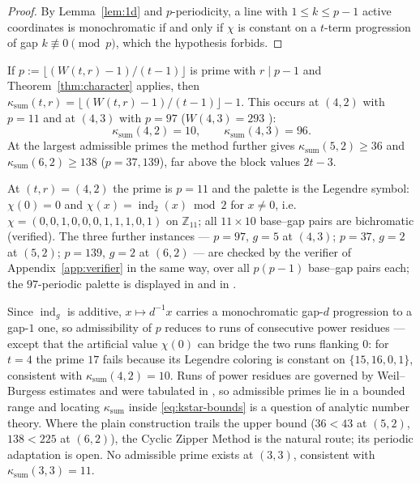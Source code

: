 \documentclass[12pt]{article}
\newcommand{\Wvdw}{W}
\newcommand{\Z}{\mathbb{Z}}
\newcommand{\ksum}{\kappa_{\mathrm{sum}}}
\DeclareMathOperator{\ind}{ind}
\begin{document}
\begin{proof}
By Lemma~\ref{lem:1d} and $p$-periodicity, a line with
$1\le k\le p-1$ active coordinates is monochromatic if and only if
$\chi$ is constant on a $t$-term progression of gap
$k\not\equiv 0\pmod p$, which the hypothesis forbids.
\end{proof}

\begin{corollary}\label{cor:character}
If $p:=\lfloor(\Wvdw(t,r)-1)/(t-1)\rfloor$ is prime with $r\mid p-1$
and Theorem~\ref{thm:character} applies, then
$\ksum(t,r)=\lfloor(\Wvdw(t,r)-1)/(t-1)\rfloor-1$. This occurs at
$(4,2)$ with $p=11$ and at $(4,3)$ with $p=97$ ($\Wvdw(4,3)=293$
\cite{Rabung1979,LandmanRobertson}):
\[
\ksum(4,2)=10,\qquad \ksum(4,3)=96 .
\]
At the largest admissible primes the method further gives
$\ksum(5,2)\ge 36$ and $\ksum(6,2)\ge 138$ ($p=37,139$), far above the
block values $2t-3$.
\end{corollary}

\begin{example}\label{ex:p11}
At $(t,r)=(4,2)$ the prime is $p=11$ and the palette is the Legendre
symbol: $\chi(0)=0$ and $\chi(x)=\ind_{2}(x)\bmod 2$ for $x\ne 0$,
i.e.\ $\chi=(0,0,1,0,0,0,1,1,1,0,1)$ on $\Z_{11}$; all $11\times 10$
base--gap pairs are bichromatic (verified). The three further
instances --- $p=97$, $g=5$ at $(4,3)$; $p=37$, $g=2$ at $(5,2)$;
$p=139$, $g=2$ at $(6,2)$ --- are checked by the verifier of
Appendix~\ref{app:verifier} in the same way, over all $p(p-1)$
base--gap pairs each; the $97$-periodic palette is displayed in
\cite{thesis} and in \cite{hjcerts}.
\end{example}

\begin{remark}\label{rem:character}
Since $\ind_{g}$ is additive, $x\mapsto d^{-1}x$ carries a
monochromatic gap-$d$ progression to a gap-$1$ one, so admissibility of
$p$ reduces to runs of consecutive power residues --- except that the
artificial value $\chi(0)$ can bridge the two runs flanking $0$: for
$t=4$ the prime $17$ fails because its Legendre coloring is constant on
$\{15,16,0,1\}$, consistent with $\ksum(4,2)=10$. Runs of power
residues are governed by Weil--Burgess estimates and were tabulated in
\cite{BuellHudson1984,LehmerLehmer1962}, so admissible primes lie in a
bounded range and locating $\ksum$ inside \eqref{eq:kstar-bounds} is a
question of analytic number theory. Where the plain construction trails
the upper bound ($36<43$ at $(5,2)$, $138<225$ at $(6,2)$), the Cyclic
Zipper Method \cite{HerwigHeuleZipper2007,RabungLotts2012} is the
natural route; its periodic adaptation is open. No admissible prime
exists at $(3,3)$, consistent with $\ksum(3,3)=11$.
\end{remark}
\end{document}
